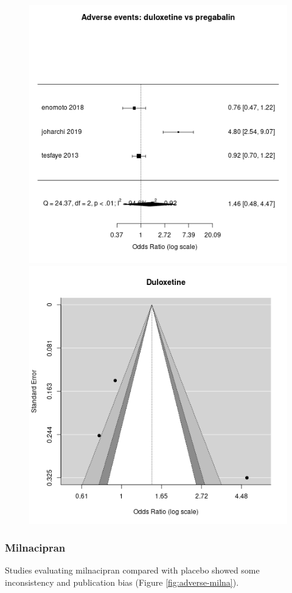 \documentclass{report}\usepackage[]{graphicx}\usepackage[]{color}
\newenvironment{knitrout}{}{} %
\begin{document}
\begin{figure}
\begin{knitrout}
\color{fgcolor}
\includegraphics[width=0.5\linewidth,height=0.35\textheight]{img/adverse-duloxetine-pregabalin-forest} 
\includegraphics[width=0.5\linewidth,height=0.35\textheight]{img/adverse-duloxetine-pregabalin-funnel} 
\end{knitrout}

\caption[Adverse: duloxetine vs pregabalin]{}
\label{fig:adverse-dulox-pregab}
\end{figure}





\subsubsection{Milnacipran}

Studies evaluating milnacipran compared with placebo showed some inconsistency and publication bias (Figure \ref{fig:adverse-milna}).
\end{document}

